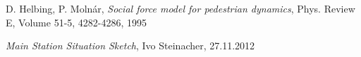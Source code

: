 
\begin{enumerate}[label = {[}\arabic*{]}]
	\item D. Helbing, P. Molnár, \textit{Social force model for pedestrian dynamics}, Phys. Review E, Volume 51-5, 4282-4286, 1995 \label{helbing}
	\item \textit{Main Station Situation Sketch}, Ivo Steinacher, 27.11.2012 \label{hbsketch}
\end{enumerate}


